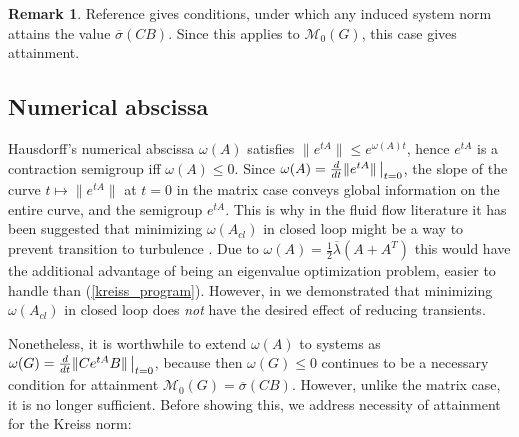 \documentclass[12pt, a4paper,reqno]{amsart}
\theoremstyle{definition}
\newtheorem{remark}{Remark}{\rm}
\begin{document}
\begin{remark}
    Reference \cite{swaroop} gives conditions, under which any induced system norm
    attains the value $\overline{\sigma}(CB)$. Since this applies to $\mathcal M_0(G)$, this case gives attainment.
\end{remark}




   
\subsection{Numerical abscissa}
\label{sect_abscissa}
Hausdorff's numerical abscissa $\omega(A)$ satisfies
$\|e^{tA}\| \leq e^{\omega(A)t}$, hence $e^{tA}$ is a contraction semigroup iff $\omega(A)\leq 0$.
Since $\omega(A)=\frac{d}{dt} \|e^{tA}\| \left\vert \begin{array}{c} \! \\ \vspace{-.4cm} \! \end{array}\right._{\!\!\!\!\!\!\!t=0}$, 
the slope of the curve $t \mapsto \|e^{tA}\|$ at $t=0$ in the matrix case conveys global information on the entire curve, and the semigroup $e^{tA}$. 
This is why in the fluid flow literature it has been suggested
that minimizing $\omega(A_{cl})$ in closed loop  might be a way to prevent transition to turbulence
\cite{whidborne2007minimization,trefethen1993hydrodynamic,trefethen_embree,hinrichsen2000transient,schmid2014analysis,MQMcW2011}. Due to
$\omega(A)=\frac{1}{2} \overline{\lambda}(A+A^T)$ this would have the additional advantage of being an eigenvalue optimization problem, easier
to handle than (\ref{kreiss_program}). However, in \cite{an_kreiss} we demonstrated that minimizing $\omega(A_{cl})$ in closed loop does {\it not} have the desired effect of reducing transients.


Nonetheless, it is worthwhile  to extend $\omega(A)$ to systems as
$\omega(G) = \frac{d}{dt}\| C e^{tA}B\| \left\vert\begin{array}{c} \! \\ \vspace{-.4cm} \! \end{array}\right._{\!\!\!\!\!\!\!t=0}$,
because then $\omega(G) \leq 0$ continues to be  a necessary condition for attainment $\mathcal M_0(G)=\overline{\sigma}(CB)$.
However, unlike the matrix case, it is no longer sufficient.  Before 
showing this, we address necessity of attainment
for the Kreiss norm:
\end{document}
